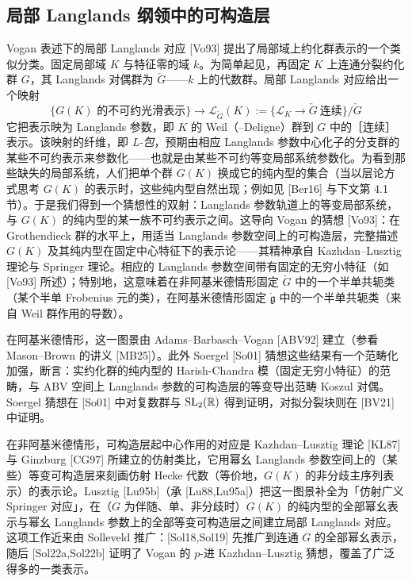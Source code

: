 \subsection{局部 Langlands 纲领中的可构造层}

Vogan 表述下的局部 Langlands 对应 [Vo93] 提出了局部域上约化群表示的一个类似分类。固定局部域 $K$ 与特征零的域 $k$。为简单起见，再固定 $K$ 上连通分裂约化群 $G$，其 Langlands 对偶群为 $\check G$——$k$ 上的代数群。局部 Langlands 对应给出一个映射
\[
\{\text{$G(K)$ 的不可约光滑表示}\}\longrightarrow\mathcal L_{\check G}(K):=\{\mathcal L_K\longrightarrow\check G\ \text{连续}\}/\check G
\]
它把表示映为 Langlands 参数，即 $K$ 的 Weil（--Deligne）群到 $G$ 中的［连续］表示。该映射的纤维，即 \emph{L-包}，预期由相应 Langlands 参数中心化子的分支群的某些不可约表示来参数化——也就是由某些不可约等变局部系统参数化。为看到那些缺失的局部系统，人们把单个群 $G(K)$ 换成它的纯内型的集合（当以层论方式思考 $G(K)$ 的表示时，这些纯内型自然出现；例如见 [Ber16] 与下文第 4.1 节）。于是我们得到一个猜想性的双射：Langlands 参数轨道上的等变局部系统，与 $G(K)$ 的纯内型的某一族不可约表示之间。这导向 Vogan 的猜想 [Vo93]：在 Grothendieck 群的水平上，用适当 Langlands 参数空间上的可构造层，完整描述 $G(K)$ 及其纯内型在固定中心特征下的表示论——其精神承自 Kazhdan--Lusztig 理论与 Springer 理论。相应的 Langlands 参数空间带有固定的无穷小特征（如 [Vo93] 所述）；特别地，这意味着在非阿基米德情形固定 $\check G$ 中的一个半单共轭类（某个半单 Frobenius 元的类），在阿基米德情形固定 $\check{\mathfrak g}$ 中的一个半单共轭类（来自 Weil 群作用的导数）。

在阿基米德情形，这一图景由 Adams--Barbasch--Vogan [ABV92] 建立（参看 Mason--Brown 的讲义 [MB25]）。此外 Soergel [So01] 猜想这些结果有一个范畴化加强，断言：实约化群的纯内型的 Harish-Chandra 模（固定无穷小特征）的范畴，与 ABV 空间上 Langlands 参数的可构造层的等变导出范畴 Koszul 对偶。Soergel 猜想在 [So01] 中对复数群与 $\mathrm{SL}_2(\mathbb{R})$ 得到证明，对拟分裂块则在 [BV21] 中证明。

在非阿基米德情形，可构造层起中心作用的对应是 Kazhdan--Lusztig 理论 [KL87] 与 Ginzburg [CG97] 所建立的仿射类比，它用幂幺 Langlands 参数空间上的（某些）等变可构造层来刻画仿射 Hecke 代数（等价地，$G(K)$ 的非分歧主序列表示）的表示论。Lusztig [Lu95b]（承 [Lu88,Lu95a]）把这一图景补全为「仿射广义 Springer 对应」，在（$G$ 为伴随、单、非分歧时）$G(K)$ 的纯内型的全部幂幺表示与幂幺 Langlands 参数上的全部等变可构造层之间建立局部 Langlands 对应。这项工作近来由 Solleveld 推广：[Sol18,Sol19] 先推广到连通 $G$ 的全部幂幺表示，随后 [Sol22a,Sol22b] 证明了 Vogan 的 $p$-进 Kazhdan--Lusztig 猜想，覆盖了广泛得多的一类表示。

